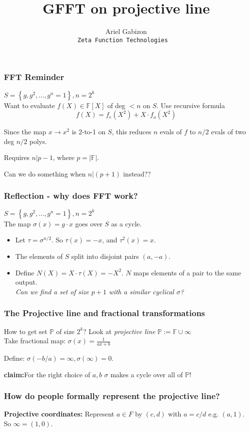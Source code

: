 \documentclass[shadesubsections,compress,14pt,mathserif]{beamer}
\title{\large{GFFT on projective line}}    %
\author{\small{Ariel Gabizon}\\                 %
\tt{\footnotesize{Zeta Function Technologies}                                       } }      %
\date{}                    %
\newcommand{\F}{\ensuremath{{\mathbb F}}}
\renewcommand{\P}{\ensuremath{{\mathbb P}}}
\newcommand{\set}[1]{\ensuremath{\left\{#1\right\}}}
\newcommand{\defeq}{\ensuremath{:=}}
\newcommand{\nl}{\\ \pause \vspace{0.2in}}
\newcommand{\nlnp}{\\ \vspace{0.2in}}
\begin{document}
\boldmath
\begin{frame}
  \titlepage
\end{frame}


\begin{frame}
 \frametitle{FFT Reminder}
 
 
 
 $S=\set{g,g^2,\ldots,g^{n}=1},n=2^k$\nl
 Want to evaluate $f(X)\in \F[X]$ of deg $<n$ on $S$.\pause
 Use recursive formula
 \[f(X)=f_e(X^2)+X\cdot f_o(X^2)\]
 
 Since the map $x\to x^2$ is 2-to-1 on $S$, this reduces $n$ evals of $f$ to $n/2$ evals of two deg $n/2$ polys.\nl

 
 Requires $n|p-1$, where $p=|\F|$.
 
 Can we do something when  $n|(p+1)$ instead?? 
 
\end{frame}
\begin{frame}
 \frametitle{Reflection - why does FFT work?}
 $S=\set{g,g^2,\ldots,g^{n}=1},n=2^k$\nl
The map $\sigma(x)=g\cdot x$ goes over $S$ as a cycle.\nl
\begin{itemize}
\item Let $\tau = \sigma^{n/2}$. So $\tau(x)=-x$, and $\tau^2(x)=x$.
\item The elements of $S$ split into disjoint pairs $(a,-a)$.\pause
\item Define $N(X)=X \cdot \tau(X)=-X^2$. $N$ maps elements of a pair to the same output.\nl  
\textit{Can we find a set of size $p+1$ with a similar cyclical $\sigma$?}
\end{itemize}

\end{frame}
\begin{frame}
 \frametitle{The Projective line and fractional transformations}
 
 How to get set $\P$ of size $2^k$?
 Look at \emph{projective line} $\P\defeq \F\cup\infty$\nl
 Take fractional map:
 $\sigma(x)= \frac{1}{ax+b}$
 
 Define: $\sigma(-b/a)=\infty,\sigma(\infty)=0$.\nl
 
 \textbf{claim:}For the right choice of $a,b$ $\sigma$ makes a cycle over all of \P!
 
 
 
\end{frame}
\begin{frame}
 \frametitle{How do people formally represent the projective line?}
 \textbf{Projective coordinates:}
 Represent $a\in F$ by  $(c,d)$ with $a=c/d$ e.g. $(a,1)$.\nlnp
 So $\infty=(1,0)$.\nl
 

\end{frame}
\end{document}

